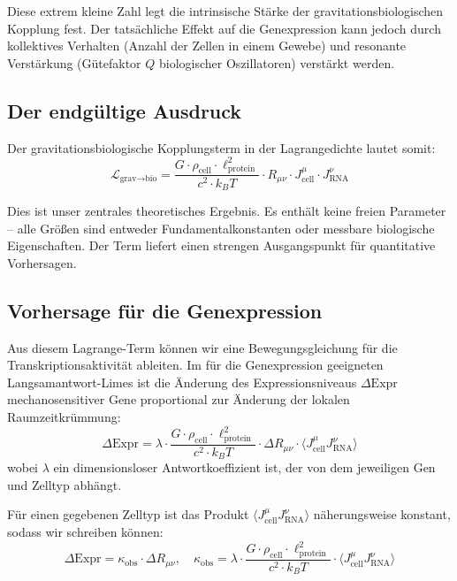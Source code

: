 \documentclass[12pt,a4paper]{article}
\theoremstyle{remark}
\begin{document}
	Diese extrem kleine Zahl legt die intrinsische Stärke der gravitationsbiologischen Kopplung fest. Der tatsächliche Effekt auf die Genexpression kann jedoch durch kollektives Verhalten (Anzahl der Zellen in einem Gewebe) und resonante Verstärkung (Gütefaktor \(Q\) biologischer Oszillatoren) verstärkt werden.
	
	\subsection{Der endgültige Ausdruck}
	
	Der gravitationsbiologische Kopplungsterm in der Lagrangedichte lautet somit:
	\begin{equation}
		\boxed{ \mathcal{L}_{\text{grav}\to\text{bio}} = \frac{G \cdot \rho_{\text{cell}} \cdot \ell_{\text{protein}}^2}{c^2 \cdot k_B T} \cdot R_{\mu\nu} \cdot J_{\text{cell}}^\mu \cdot J_{\text{RNA}}^\nu }
		\label{eq:final}
	\end{equation}
	
	Dies ist unser zentrales theoretisches Ergebnis. Es enthält keine freien Parameter – alle Größen sind entweder Fundamentalkonstanten oder messbare biologische Eigenschaften. Der Term liefert einen strengen Ausgangspunkt für quantitative Vorhersagen.
	
	\subsection{Vorhersage für die Genexpression}
	
	Aus diesem Lagrange-Term können wir eine Bewegungsgleichung für die Transkriptionsaktivität ableiten. Im für die Genexpression geeigneten Langsamantwort-Limes ist die Änderung des Expressionsniveaus \(\Delta\text{Expr}\) mechanosensitiver Gene proportional zur Änderung der lokalen Raumzeitkrümmung:
	\begin{equation}
		\Delta\text{Expr} = \lambda \cdot \frac{G \cdot \rho_{\text{cell}} \cdot \ell_{\text{protein}}^2}{c^2 \cdot k_B T} \cdot \Delta R_{\mu\nu} \cdot \langle J_{\text{cell}}^\mu J_{\text{RNA}}^\nu \rangle
		\label{eq:prediction-raw}
	\end{equation}
	wobei \(\lambda\) ein dimensionsloser Antwortkoeffizient ist, der von dem jeweiligen Gen und Zelltyp abhängt.
	
	Für einen gegebenen Zelltyp ist das Produkt \(\langle J_{\text{cell}}^\mu J_{\text{RNA}}^\nu \rangle\) näherungsweise konstant, sodass wir schreiben können:
	\begin{equation}
		\Delta\text{Expr} = \kappa_{\text{obs}} \cdot \Delta R_{\mu\nu}, \quad 
		\kappa_{\text{obs}} = \lambda \cdot \frac{G \cdot \rho_{\text{cell}} \cdot \ell_{\text{protein}}^2}{c^2 \cdot k_B T} \cdot \langle J_{\text{cell}}^\mu J_{\text{RNA}}^\nu \rangle
		\label{eq:prediction-simple}
	\end{equation}
	
\end{document}
